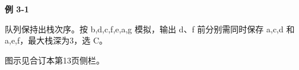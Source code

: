 {\color{ink}\bfseries 例 3-1}\par\vspace{1bp}队列保持出栈次序。按 b,\allowbreak{}d,\allowbreak{}c,\allowbreak{}f,\allowbreak{}e,\allowbreak{}a,\allowbreak{}g 模拟，输出 d、f 前分别需同时保存 a,\allowbreak{}c,\allowbreak{}d 和 a,\allowbreak{}e,\allowbreak{}f，最大栈深为3，选 C。\par {\color{ink}图示见合订本第13页侧栏。}
